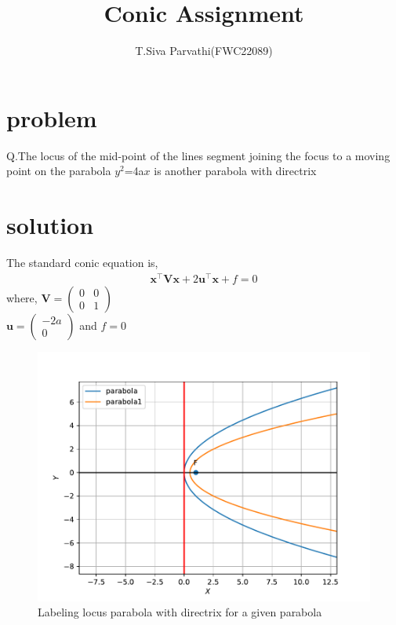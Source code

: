 \documentclass[journal,12pt,twocolumn]{IEEEtran}
\title{\mytitle}
\title{
Conic Assignment 
}
\author{T.Siva Parvathi(FWC22089)}
\newcommand{\myvec}[1]{\ensuremath{\begin{pmatrix}#1\end{pmatrix}}}
\let\vec\mathbf
\begin{document}
\maketitle
\tableofcontents
\bigskip


\section{\textbf{problem}}
Q.The locus of the mid-point of the lines segment joining the focus to a moving point on the parabola $y^2$=4a$x$ is another parabola with directrix

\section{\textbf{solution}}
The standard conic equation is,\\
\begin{align}
\label{eq:one}
\vec{x}^\top\vec{Vx}+2\vec{u}^\top\vec{x}+f=0
\end{align} 
 where,
$\vec{V}=\myvec{0&0 \\0&1}$\\ $\vec{u}=\myvec{-2a\\0}$ and $f=0$ \\


\begin{figure}[h]
    \centering
\includegraphics[width=\columnwidth]{cofig.pdf}
\caption{Labeling locus parabola with directrix for a given parabola}
    \label{fig:my_label}
\end{figure}
\end{document}
